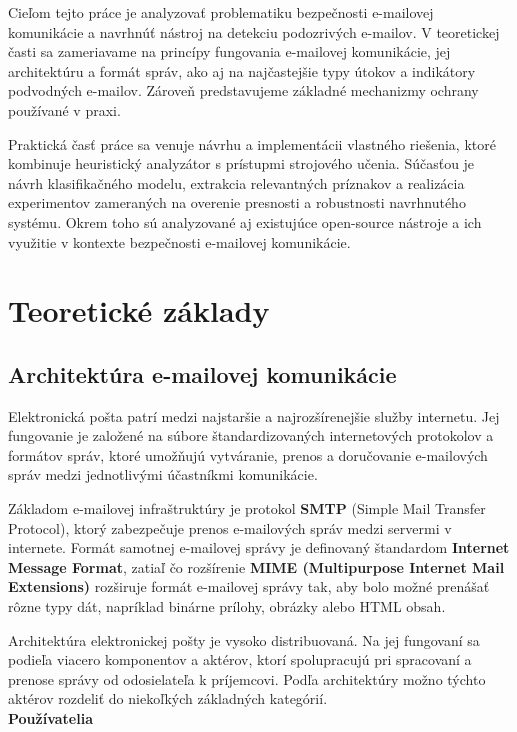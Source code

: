 \documentclass[conference]{IEEEtran}
\begin{document}
Cieľom tejto práce je analyzovať problematiku bezpečnosti e-mailovej komunikácie a navrhnúť nástroj na detekciu podozrivých e-mailov. V teoretickej časti sa zameriavame na princípy fungovania e-mailovej komunikácie, jej architektúru a formát správ, ako aj na najčastejšie typy útokov a indikátory podvodných e-mailov. Zároveň predstavujeme základné mechanizmy ochrany používané v praxi.

Praktická časť práce sa venuje návrhu a implementácii vlastného riešenia, ktoré kombinuje heuristický analyzátor s prístupmi strojového učenia. Súčasťou je návrh klasifikačného modelu, extrakcia relevantných príznakov a realizácia experimentov zameraných na overenie presnosti a robustnosti navrhnutého systému. Okrem toho sú analyzované aj existujúce open-source nástroje a ich využitie v kontexte bezpečnosti e-mailovej komunikácie.
\section{Teoretické základy}
\subsection{Architektúra e-mailovej komunikácie}

Elektronická pošta patrí medzi najstaršie a najrozšírenejšie služby internetu. 
Jej fungovanie je založené na súbore štandardizovaných internetových protokolov 
a formátov správ, ktoré umožňujú vytváranie, prenos a doručovanie e-mailových správ 
medzi jednotlivými účastníkmi komunikácie\cite{rfc5598}.

Základom e-mailovej infraštruktúry je protokol \textbf{SMTP} (Simple Mail Transfer Protocol), 
ktorý zabezpečuje prenos e-mailových správ medzi servermi v internete. 
Formát samotnej e-mailovej správy je definovaný štandardom 
\textbf{Internet Message Format}, zatiaľ čo rozšírenie \textbf{MIME (Multipurpose Internet Mail Extensions)} 
rozširuje formát e-mailovej správy tak, aby bolo možné prenášať 
rôzne typy dát, napríklad binárne prílohy, obrázky alebo HTML obsah\cite{rfc5598}.

Architektúra elektronickej pošty je vysoko distribuovaná. 
Na jej fungovaní sa podieľa viacero komponentov a aktérov, ktorí spolupracujú 
pri spracovaní a prenose správy od odosielateľa k príjemcovi. 
Podľa architektúry možno týchto aktérov rozdeliť 
do niekoľkých základných kategórií\cite{rfc5598}.\\


\textbf{Používatelia}
\end{document}
